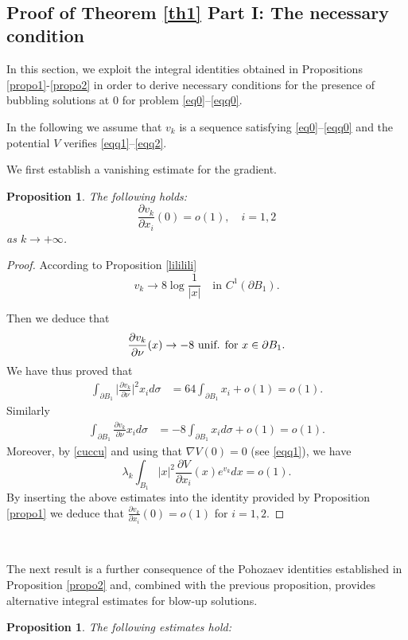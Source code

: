 \documentclass[reqno,11pt]{amsart}
\newtheorem{prop}[thm]{Proposition}
\theoremstyle{definition}
\numberwithin{equation}{section}
\newcommand{\la}{\lambda}
\renewcommand{\(}{\left(}
\renewcommand{\)}{\right)}
\renewcommand{\[}{\left[}
\renewcommand{\]}{\right]}
\newcommand{\beq}{\begin{equation}}
\newcommand{\eeq}{\end{equation}}
\begin{document}
{\


 
 


\subsection{{\large{Proof of Theorem \ref{th1} Part I: The necessary condition} }}
In this section, we exploit the integral identities obtained in Propositions \ref{propo1}-\ref{propo2} in order to derive necessary conditions for  the presence of bubbling solutions at $0$  for problem \eqref{eq0}--\eqref{eqq0}. 




In the following we assume that  $v_k$ is a sequence satisfying \eqref{eq0}--\eqref{eqq0} and the potential $V$ verifies \eqref{eqq1}--\eqref{eqq2}.


We first establish a vanishing estimate for the gradient. 
\begin{prop}\label{necessary} The following holds: $$\frac{\partial v_k}{\partial x_i}(0)=o(1) ,\quad i=1,2$$
as $k\to +\infty$. 


\end{prop}

\begin{proof} According to Proposition \ref{lililili} %
$$
v_k \longrightarrow 8\log\frac{1}{|x|}\quad \text{in } C^1(\partial B_1).
$$


Then we deduce  that
\beq\label{beda}\frac{\partial v_k}{\partial \nu}(x)\to  -8\hbox{ unif. for } x\in\partial B_1.\eeq
We have thus proved that 
$$\begin{aligned}\int_{\partial B_1} \bigg|\frac{\partial v_k}{\partial \nu}\bigg|^2x_i d\sigma&=64  \int_{\partial B_1}x_i+o(1)=o(1).
\end{aligned}
$$
Similarly
$$\begin{aligned}\int_{\partial B_1}\frac{\partial v_k}{\partial \nu}x_i d\sigma&=-8 \int_{\partial B_1}x_i d\sigma+o(1)=o(1).
\end{aligned}
$$
Moreover, by \eqref{cuccu} and using that $\nabla V(0)=0$ (see \eqref{eqq1}), we have
$$
 \la_k\int_{B_1} |x|^{2} \frac{\partial V}{\partial x_i}(x) e^{v_k}dx=o(1). $$ 
By inserting the above estimates into the identity provided by Proposition \ref{propo1} we deduce that $\frac{\partial v_k}{\partial x_i}(0)=o(1) $ for $i=1,2$.
\end{proof}

\

The  next result is a further consequence of the Pohozaev identities established in Proposition \ref{propo2} and, combined with the  previous proposition,  provides   alternative integral estimates for  blow-up solutions.  
\begin{prop}\label{necessary1} The following estimates hold: 




\end{prop}}
\end{document}

